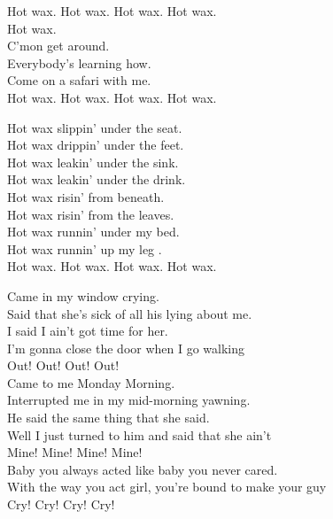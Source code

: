 Hot wax. Hot wax. Hot wax. Hot wax. \\

Hot wax. \\
C'mon get around. \\
Everybody's learning how. \\
Come on a safari with me. \\

Hot wax. Hot wax. Hot wax. Hot wax. \\


Hot wax slippin' under the seat. \\
Hot wax drippin' under the feet. \\
Hot wax leakin' under the sink. \\
Hot wax leakin' under the drink. \\

Hot wax risin' from beneath. \\
Hot wax risin' from the leaves. \\
Hot wax runnin' under my bed. \\
Hot wax runnin' up my leg . \\

Hot wax. Hot wax. Hot wax. Hot wax. \\





Came in my window crying. \\
Said that she's sick of all his lying about me. \\
I said I ain't got time for her. \\
I'm gonna close the door when I go walking \\
Out! Out! Out! Out! \\

Came to me Monday Morning. \\
Interrupted me in my mid-morning yawning. \\
He said the same thing that she said. \\
Well I just turned to him and said that she ain't \\
Mine! Mine! Mine! Mine! \\

Baby you always acted like baby you never cared. \\
With the way you act girl, you're bound to make your guy \\
Cry! Cry! Cry! Cry! \\

